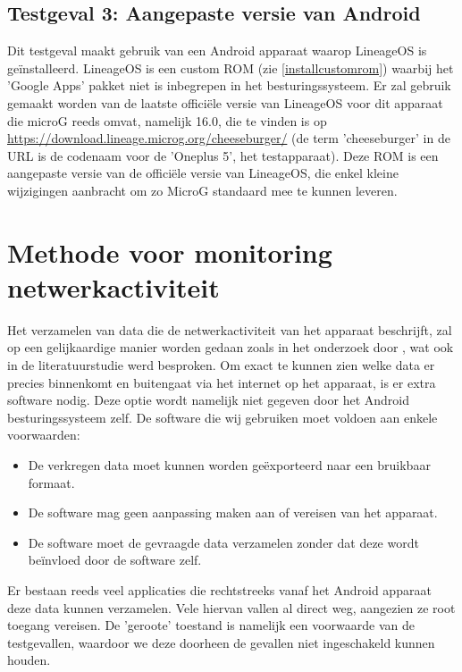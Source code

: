 \subsection{Testgeval 3: Aangepaste versie van Android}
\label{sec:testgeval3}
Dit testgeval maakt gebruik van een Android apparaat waarop LineageOS is geïnstalleerd. LineageOS is een custom ROM (zie \ref{installcustomrom}) waarbij het 'Google Apps' pakket niet is inbegrepen in het besturingssysteem. Er zal gebruik gemaakt worden van de laatste officiële versie van LineageOS voor dit apparaat die microG reeds omvat, namelijk 16.0, die te vinden is op \url{https://download.lineage.microg.org/cheeseburger/} (de term 'cheeseburger' in de URL is de codenaam voor de 'Oneplus 5', het testapparaat). Deze ROM is een aangepaste versie van de officiële versie van LineageOS, die enkel kleine wijzigingen aanbracht om zo MicroG standaard mee te kunnen leveren.

\section{Methode voor monitoring netwerkactiviteit}
\label{sec:metingsoftware}
Het verzamelen van data die de netwerkactiviteit van het apparaat beschrijft, zal op een gelijkaardige manier worden gedaan zoals in het onderzoek door \cite{schmidt_google-data-collection}, wat ook in de literatuurstudie werd besproken. Om exact te kunnen zien welke data er precies binnenkomt en buitengaat via het internet op het apparaat, is er extra software nodig. Deze optie wordt namelijk niet gegeven door het Android besturingssysteem zelf. De software die wij gebruiken moet voldoen aan enkele voorwaarden:
\begin{itemize}
    \item De verkregen data moet kunnen worden geëxporteerd naar een bruikbaar formaat.
    \item De software mag geen aanpassing maken aan of vereisen van het apparaat.
    \item De software moet de gevraagde data verzamelen zonder dat deze wordt beïnvloed door de software zelf.
\end{itemize}
Er bestaan reeds veel applicaties die rechtstreeks vanaf het Android apparaat deze data kunnen verzamelen. Vele hiervan vallen al direct weg, aangezien ze root toegang vereisen. De 'geroote' toestand is namelijk een voorwaarde van de testgevallen, waardoor we deze doorheen de gevallen niet ingeschakeld kunnen houden. 

